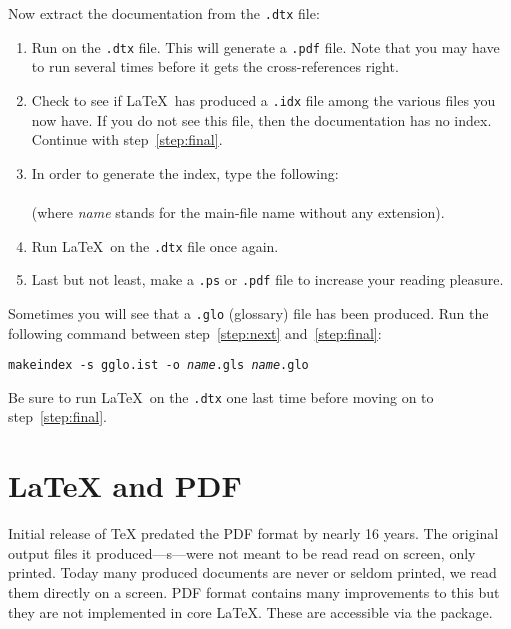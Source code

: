 \noindent Now extract the documentation from the
\texttt{.dtx} file:

\begin{enumerate}
  \item Run  on the \texttt{.dtx} file.  This will generate a
        \texttt{.pdf} file. Note that you may have to run 
        several times before it gets the cross-references right.
  \item Check to see if \LaTeX\ has produced a \texttt{.idx} file
        among the various files you now have.
        If you do not see this file, then the documentation has no index. Continue
        with step~\ref{step:final}.
  \item In order to generate the index, type the following:\\
        \\
        (where \textit{name} stands for the main-file name without any
        extension).
  \item Run \LaTeX\ on the \texttt{.dtx} file once again.\label{step:next}

  \item Last but not least, make a \texttt{.ps} or \texttt{.pdf}
        file to increase your reading pleasure.\label{step:final}

\end{enumerate}

Sometimes you will see that a \texttt{.glo}
(glossary) file has been produced. Run the following
command between
step~\ref{step:next} and~\ref{step:final}:

\noindent\texttt{makeindex -s gglo.ist -o \textit{name}.gls \textit{name}.glo}

\noindent Be sure to run \LaTeX\ on the \texttt{.dtx} one last
time before moving on to step~\ref{step:final}.


\section{\LaTeX{} and PDF}\label{sec:pdftex}
\begingroup
{}
Initial release of \TeX{} predated the PDF format by nearly 16 years. The
original output files it produced---s---were not meant to be read
read on screen, only printed. Today many produced documents are never or seldom
printed, we read them directly on a screen. PDF format contains many
improvements to this but they are not implemented in core \LaTeX{}. These are
accessible via the  package.

